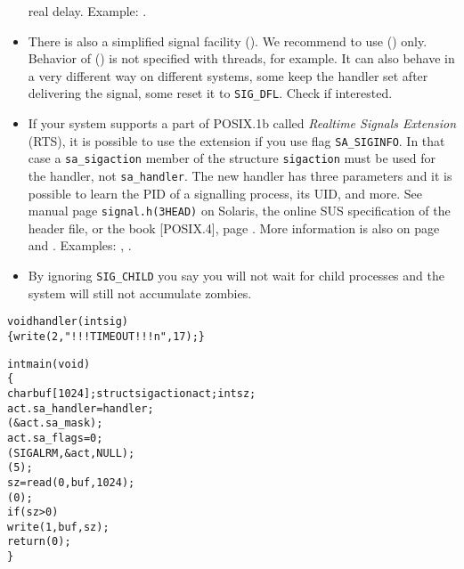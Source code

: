 \begin{itemize}
real delay.
Example: .
\item There is also a simplified signal facility ().  We recommend
to use () only.  Behavior of () is not specified
with threads, for example.  It can also behave in a very different way on
different systems, some keep the handler set after delivering the signal, some
reset it to \texttt{SIG\_DFL}.  Check  if
interested.
\item \label{REALTIMEEXTENSIONS} If your system supports a part of POSIX.1b
called \emph{Realtime Signals Extension} (RTS), it is possible to use the
extension if you use flag \texttt{SA\_SIGINFO}.  In that case a
\texttt{sa\_sigaction} member of the structure \texttt{sigaction} must be used
for the handler, not \texttt{sa\_handler}.  The new handler has three parameters
and it is possible to learn the PID of a signalling process, its UID, and more.
See manual page \texttt{signal.h(3HEAD)} on Solaris, the online SUS
specification of the header file, or the book [POSIX.4], page
\pageref{REF_PROGRAMMING}.  More information is also on page \pageref{POSIX} and
\pageref{SIGWAITINFO}.  Examples: ,
.
\item \label{IGNORE_SIG_CHLD} By ignoring \texttt{SIG\_CHILD} you say you will
not wait for child processes and the system will still not accumulate zombies.
\end{itemize}


\begin{slide}
\setlength{\baselineskip}{0.8\baselineskip}
\begin{alltt}
void handler(int sig)
\{ write(2," !!! TIMEOUT !!! \bs{}n", 17); \}

int main(void)
\{
    char buf[1024]; struct sigaction act; int sz;
    act.sa\_handler = handler;
    (&act.sa\_mask);
    act.sa\_flags = 0;
    (SIGALRM, &act, NULL);
    (5);
    sz = read(0, buf, 1024);
    (0);
    if (sz > 0)
        write(1, buf, sz);
    return (0);
\}
\end{alltt}
\end{slide}

\label{SIGALRM}

